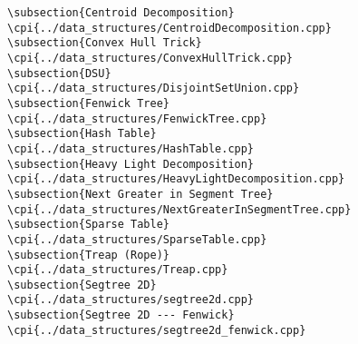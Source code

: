 {\begin{verbatim}
\subsection{Centroid Decomposition}
\cpi{../data_structures/CentroidDecomposition.cpp}
\subsection{Convex Hull Trick}
\cpi{../data_structures/ConvexHullTrick.cpp}
\subsection{DSU}
\cpi{../data_structures/DisjointSetUnion.cpp}
\subsection{Fenwick Tree}
\cpi{../data_structures/FenwickTree.cpp}
\subsection{Hash Table}
\cpi{../data_structures/HashTable.cpp}
\subsection{Heavy Light Decomposition}
\cpi{../data_structures/HeavyLightDecomposition.cpp}
\subsection{Next Greater in Segment Tree}
\cpi{../data_structures/NextGreaterInSegmentTree.cpp}
\subsection{Sparse Table}
\cpi{../data_structures/SparseTable.cpp}
\subsection{Treap (Rope)}
\cpi{../data_structures/Treap.cpp}
\subsection{Segtree 2D}
\cpi{../data_structures/segtree2d.cpp}
\subsection{Segtree 2D --- Fenwick}
\cpi{../data_structures/segtree2d_fenwick.cpp}



\end{verbatim}}
